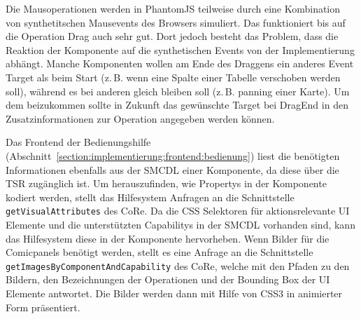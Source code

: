 \documentclass[
	headsepline,
	footsepline,
	fontsize=12pt,
	bibliography=totoc
]{scrbook}
\begin{document}

Die Mausoperationen werden in PhantomJS teilweise durch eine Kombination von synthetitschen Mausevents des Browsers simuliert. Das funktioniert bis auf die Operation Drag auch sehr gut. Dort jedoch besteht das Problem, dass die Reaktion der Komponente auf die synthetischen Events von der Implementierung abhängt. Manche Komponenten wollen am Ende des Draggens ein anderes Event Target als beim Start (z.\,B. wenn eine Spalte einer Tabelle verschoben werden soll), während es bei anderen gleich bleiben soll (z.\,B. panning einer Karte). Um dem beizukommen sollte in Zukunft das gewünschte Target bei DragEnd in den Zusatzinformationen zur Operation angegeben werden können.


Das Frontend der Bedienungshilfe (Abschnitt~\ref{section:implementierung:frontend:bedienung}) liest die benötigten Informationen ebenfalls aus der SMCDL einer Komponente, da diese über die TSR zugänglich ist. Um herauszufinden, wie Propertys in der Komponente kodiert werden, stellt das Hilfesystem Anfragen an die Schnittstelle \texttt{getVisualAttributes} des CoRe. Da die CSS Selektoren für aktionsrelevante UI Elemente und die unterstützten Capabilitys in der SMCDL vorhanden sind, kann das Hilfesystem diese in der Komponente hervorheben. Wenn Bilder für die Comicpanels benötigt werden, stellt es eine Anfrage an die Schnittstelle \texttt{getImagesByComponentAndCapability} des CoRe, welche mit den Pfaden zu den Bildern, den Bezeichnungen der Operationen und der Bounding Box der UI Elemente antwortet. Die Bilder werden dann mit Hilfe von CSS3 in animierter Form präsentiert.

\end{document}
